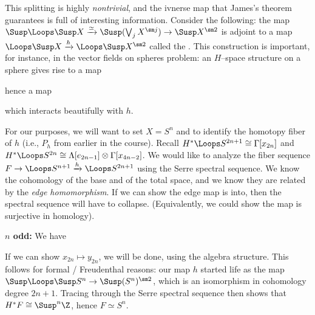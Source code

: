 This splitting is highly \emph{nontrivial}, and the ivnerse map that James's theorem guarantees is full of interesting information.  Consider the following: the map $\Susp \Loops \Susp X \xrightarrow\simeq \Susp(\bigvee_j X^{\sm j}) \to \Susp X^{\sm 2}$ is adjoint to a map $\Loops \Susp X \xrightarrow h \Loops \Susp X^{\sm 2}$ called the .  This construction is important, for instance, in the vector fields on spheres problem: an $H$--space structure on a sphere gives rise to a map
\begin{center}
\end{center}
hence a map
\begin{center}
\end{center}
which interacts beautifully with $h$.

For our purposes, we will want to set $X = S^n$ and to identify the homotopy fiber of $h$ (i.e., $P_h$ from earlier in the course).  Recall $H^* \Loops S^{2n+1} \cong \Gamma[x_{2n}]$ and $H^* \Loops S^{2n} \cong \Lambda[e_{2n-1}] \otimes \Gamma[x_{4n-2}]$.  We would like to analyze the fiber sequence $F \to \Loops S^{n+1} \xrightarrow h \Loops S^{2n+1}$ using the Serre spectral sequence.  We know the cohomology of the base and of the total space, and we know they are related by the \emph{edge homomorphism}.  If we can show the edge map is into, then the spectral sequence will have to collapse.  (Equivalently, we could show the map is surjective in homology).

\textbf{$n$ odd:} We have
\begin{center}
\end{center}
If we can show $x_{2n} \mapsto y_{2n}$, we will be done, using the algebra structure.  This follows for formal / Freudenthal reasons: our map $h$ started life as the map $\Susp \Loops \Susp S^n \to \Susp(S^n)^{\sm 2}$, which is an isomorphism in cohomology degree $2n+1$.  Tracing through the Serre spectral sequence then shows that $H^* F \cong \Susp^n \Z$, hence $F \simeq S^n$.

